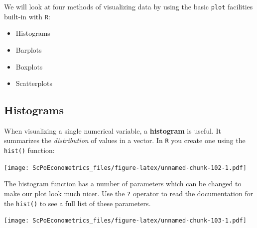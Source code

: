 \documentclass[]{book}
\newenvironment{Shaded}{\begin{snugshade}}{\end{snugshade}}
\newcommand{\KeywordTok}[1]{\textcolor[rgb]{0.13,0.29,0.53}{\textbf{#1}}}
\newcommand{\DataTypeTok}[1]{\textcolor[rgb]{0.13,0.29,0.53}{#1}}
\newcommand{\DecValTok}[1]{\textcolor[rgb]{0.00,0.00,0.81}{#1}}
\newcommand{\StringTok}[1]{\textcolor[rgb]{0.31,0.60,0.02}{#1}}
\newcommand{\CommentTok}[1]{\textcolor[rgb]{0.56,0.35,0.01}{\textit{#1}}}
\newcommand{\OperatorTok}[1]{\textcolor[rgb]{0.81,0.36,0.00}{\textbf{#1}}}
\newcommand{\NormalTok}[1]{#1}
\providecommand{\tightlist}{%
  \setlength{\itemsep}{0pt}\setlength{\parskip}{0pt}}
\theoremstyle{definition}
\theoremstyle{definition}
\theoremstyle{definition}
\theoremstyle{remark}
\begin{document}
We will look at four methods of visualizing data by using the basic
\texttt{plot} facilities built-in with \texttt{R}:

\begin{itemize}
\tightlist
\item
  Histograms
\item
  Barplots
\item
  Boxplots
\item
  Scatterplots
\end{itemize}

\subsection{Histograms}\label{histograms}

When visualizing a single numerical variable, a \textbf{histogram} is
useful. It summarizes the \emph{distribution} of values in a vector. In
\texttt{R} you create one using the \texttt{hist()} function:

\begin{Shaded}
\end{Shaded}

\texttt{[image: ScPoEconometrics\_files/figure-latex/unnamed-chunk-102-1.pdf]}

The histogram function has a number of parameters which can be changed
to make our plot look much nicer. Use the \texttt{?} operator to read
the documentation for the \texttt{hist()} to see a full list of these
parameters.

\begin{Shaded}
\end{Shaded}

\texttt{[image: ScPoEconometrics\_files/figure-latex/unnamed-chunk-103-1.pdf]}
\end{document}
